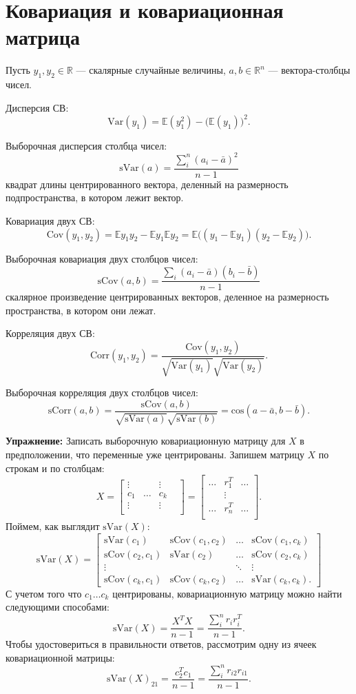 \documentclass[12pt]{article} %
\theoremstyle{definition} %
\begin{document}
\section{Ковариация и ковариационная матрица}
Пусть $y_1, y_2 \in \mathbb{R}$ — скалярные случайные величины,
$a, b \in \mathbb{R}^n$ — вектора-столбцы чисел.


Дисперсия СВ:
$$\text{Var}(y_1) = \mathbb{E}(y_1^2) - \big( \mathbb{E}(y_1) \big)^2.$$

Выборочная дисперсия столбца чисел:
$$\text{sVar}(a) = \frac{\sum_{i}^n (a_i - \bar{a})^2}{n-1}$$
квадрат длины центрированного вектора, деленный на размерность подпространства, в котором лежит вектор.

Ковариация двух СВ:
$$\text{Cov}(y_1, y_2) = \mathbb{E}y_1 y_2 - \mathbb{E}y_1 \mathbb{E}y_2= \mathbb{E} \bigg( (y_1 - \mathbb{E}y_1) (y_2 - \mathbb{E}y_2) \bigg).$$

Выборочная ковариация двух столбцов чисел:
$$\text{sCov}(a, b) = \frac{\sum_i (a_{i} - \bar{a}) (b_{i} - \bar{b})}{n-1}$$
скалярное произведение центрированных векторов, деленное на размерность пространства, в котором они лежат.

Корреляция двух СВ:
$$\text{Corr}(y_1, y_2) = \frac{\text{Cov}(y_1, y_2)}
{\sqrt{\text{Var}(y_1)} \sqrt{\text{Var}(y_2)} }. $$

Выборочная корреляция двух столбцов чисел:
$$\text{sCorr}(a, b) = \frac{\text{sCov}(a, b)}
{\sqrt{\text{sVar}(a)} \sqrt{\text{sVar}(b)} } =
\text{cos} (a - \bar{a}, b - \bar{b}). $$

\textbf{Упражнение:}
Записать выборочную ковариационную матрицу для $X$ в предположении, что переменные уже центрированы. Запишем матрицу $X$ по строкам и по столбцам:
$$
X = \begin{bmatrix}
    \vdots &  & \vdots & \\
    c_1 & \dots & c_k \\
    \vdots &  & \vdots & \\
    \end{bmatrix}
    =
    \begin{bmatrix}
    \dots & r_{1}^T & \dots \\
    & \vdots & \\
    \dots & r_{n}^T & \dots \\
    \end{bmatrix}.
$$
Поймем, как выглядит $\text{sVar}(X)$:
$$
\text{sVar}(X) = \begin{bmatrix}
\text{sVar}(c_1) & \text{sCov}(c_1, c_2) & \dots & \text{sCov}(c_1, c_k) \\
\text{sCov}(c_2, c_1) & \text{sVar}(c_2) & \dots & \text{sCov}(c_2, c_k) \\
\vdots & & \ddots & \vdots\\
\text{sCov}(c_k, c_1) & \text{sCov}(c_k, c_2) & \dots & \text{sVar}(c_k, c_k).
\end{bmatrix}
$$
С учетом того что $c_1 \dots c_k$ центрированы, ковариационную матрицу можно найти следующими способами:
$$\text{sVar}(X) = \frac{X^TX}{n-1} = \frac{\sum_i^n r_i r_i^T}{n-1}.$$
Чтобы удостовериться в правильности ответов, рассмотрим одну из ячеек ковариационной матрицы:
$$\text{sVar}(X)_{21} = \frac{c_2^Tc_1}{n-1} = \frac{\sum_i^n r_{i2} r_{i1} }{n-1}. $$
\end{document}
